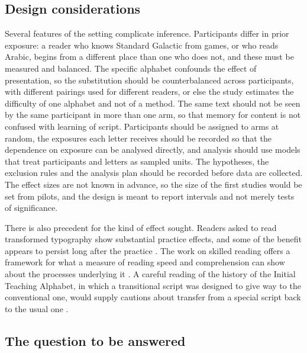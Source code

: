 \subsection{Design considerations}

Several features of the setting complicate inference. Participants differ in prior exposure: a reader who knows Standard Galactic from games, or who reads Arabic, begins from a different place than one who does not, and these must be measured and balanced. The specific alphabet confounds the effect of presentation, so the substitution should be counterbalanced across participants, with different pairings used for different readers, or else the study estimates the difficulty of one alphabet and not of a method. The same text should not be seen by the same participant in more than one arm, so that memory for content is not confused with learning of script. Participants should be assigned to arms at random, the exposures each letter receives should be recorded so that the dependence on exposure can be analysed directly, and analysis should use models that treat participants and letters as sampled units. The hypotheses, the exclusion rules and the analysis plan should be recorded before data are collected. The effect sizes are not known in advance, so the size of the first studies would be set from pilots, and the design is meant to report intervals and not merely tests of significance.

There is also precedent for the kind of effect sought. Readers asked to read transformed typography show substantial practice effects, and some of the benefit appears to persist long after the practice \citep{kolers1976}. The work on skilled reading offers a framework for what a measure of reading speed and comprehension can show about the processes underlying it \citep{rayner2012}. A careful reading of the history of the Initial Teaching Alphabet, in which a transitional script was designed to give way to the conventional one, would supply cautions about transfer from a special script back to the usual one \citep{downing1967}.

\subsection{The question to be answered}

